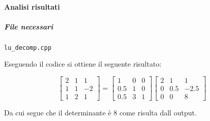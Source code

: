 \paragraph{Analisi risultati}

\subparagraph{File necessari} \texttt{lu\_decomp.cpp}

Eseguendo il codice si ottiene il seguente risultato:

$$
    \begin{bmatrix}
        2 & 1 & 1  \\
        1 & 1 & -2 \\
        1 & 2 & 1
    \end{bmatrix} = \begin{bmatrix}
		1   & 0 & 0 \\
		0.5 & 1 & 0 \\
		0.5 & 3 & 1
	\end{bmatrix} \begin{bmatrix}
		2 & 1   & 1    \\
		0 & 0.5 & -2.5 \\
		0 & 0   & 8
	\end{bmatrix}
$$

Da cui segue che il determinante è 8 come risulta dall output.

